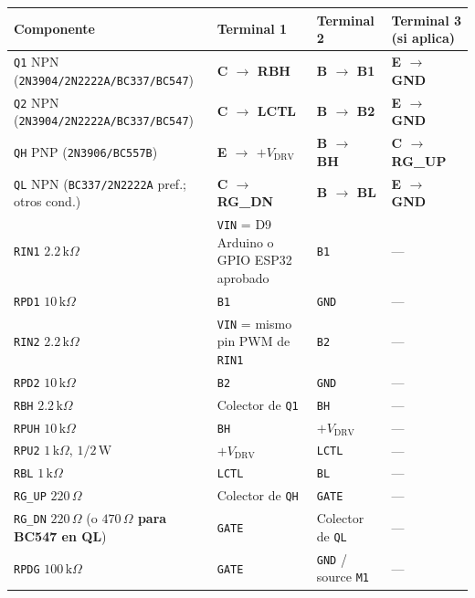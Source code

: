 \documentclass[10pt, a4paper, landscape]{article}
\begin{document}
{\footnotesize
\begin{tabularx}{\linewidth}{|>{\raggedright\arraybackslash}p{6.2cm}|>{\raggedright\arraybackslash}p{4.8cm}|>{\raggedright\arraybackslash}p{5.2cm}|>{\raggedright\arraybackslash}X|}
\hline
\rowcolor{ucbgray}
\textbf{Componente} & \textbf{Terminal 1} & \textbf{Terminal 2} & \textbf{Terminal 3 (si aplica)} \\ \hline
\texttt{Q1} NPN (\texttt{2N3904/2N2222A/BC337/BC547}) & \textbf{C $\rightarrow$ RBH} & \textbf{B $\rightarrow$ B1} & \textbf{E $\rightarrow$ GND} \\ \hline
\texttt{Q2} NPN (\texttt{2N3904/2N2222A/BC337/BC547}) & \textbf{C $\rightarrow$ LCTL} & \textbf{B $\rightarrow$ B2} & \textbf{E $\rightarrow$ GND} \\ \hline
\texttt{QH} PNP (\texttt{2N3906/BC557B}) & \textbf{E $\rightarrow$ $+V_{\text{DRV}}$} & \textbf{B $\rightarrow$ BH} & \textbf{C $\rightarrow$ RG\_UP} \\ \hline
\texttt{QL} NPN (\texttt{BC337/2N2222A} pref.; otros cond.) & \textbf{C $\rightarrow$ RG\_DN} & \textbf{B $\rightarrow$ BL} & \textbf{E $\rightarrow$ GND} \\ \hline
\texttt{RIN1} $2.2\,\text{k}\Omega$ & \texttt{VIN} = D9 Arduino o GPIO ESP32 aprobado & \texttt{B1} & --- \\ \hline
\texttt{RPD1} $10\,\text{k}\Omega$ & \texttt{B1} & \texttt{GND} & --- \\ \hline
\texttt{RIN2} $2.2\,\text{k}\Omega$ & \texttt{VIN} = mismo pin PWM de \texttt{RIN1} & \texttt{B2} & --- \\ \hline
\texttt{RPD2} $10\,\text{k}\Omega$ & \texttt{B2} & \texttt{GND} & --- \\ \hline
\texttt{RBH} $2.2\,\text{k}\Omega$ & Colector de \texttt{Q1} & \texttt{BH} & --- \\ \hline
\texttt{RPUH} $10\,\text{k}\Omega$ & \texttt{BH} & $+V_{\text{DRV}}$ & --- \\ \hline
\texttt{RPU2} $1\,\text{k}\Omega$, $1/2\,\text{W}$ & $+V_{\text{DRV}}$ & \texttt{LCTL} & --- \\ \hline
\texttt{RBL} $1\,\text{k}\Omega$ & \texttt{LCTL} & \texttt{BL} & --- \\ \hline
\texttt{RG\_UP} $220\,\Omega$ & Colector de \texttt{QH} & \texttt{GATE} & --- \\ \hline
\texttt{RG\_DN} $220\,\Omega$ (o \textbf{$470\,\Omega$ para BC547 en QL}) & \texttt{GATE} & Colector de \texttt{QL} & --- \\ \hline
\texttt{RPDG} $100\,\text{k}\Omega$ & \texttt{GATE} & \texttt{GND} / source \texttt{M1} & --- \\ \hline

\end{tabularx}}
\end{document}
